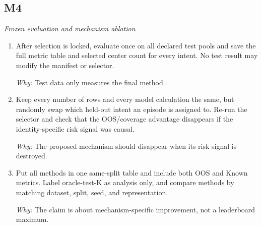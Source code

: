 \documentclass[10pt,a4paper]{article}
\begin{document}
\subsection*{M4}
\emph{Frozen evaluation and mechanism ablation}
\begin{enumerate}[leftmargin=*,start=7]
  \item After selection is locked, evaluate once on all declared test pools and save the full metric table and selected center count for every intent. No test result may modify the manifest or selector.
\par\emph{Why:} Test data only measures the final method.
  \item Keep every number of rows and every model calculation the same, but randomly swap which held-out intent an episode is assigned to. Re-run the selector and check that the OOS/coverage advantage disappears if the identity-specific risk signal was causal.
\par\emph{Why:} The proposed mechanism should disappear when its risk signal is destroyed.
  \item Put all methods in one same-split table and include both OOS and Known metrics. Label oracle-test-K as analysis only, and compare methods by matching dataset, split, seed, and representation.
\par\emph{Why:} The claim is about mechanism-specific improvement, not a leaderboard maximum.
\end{enumerate}
\end{document}
